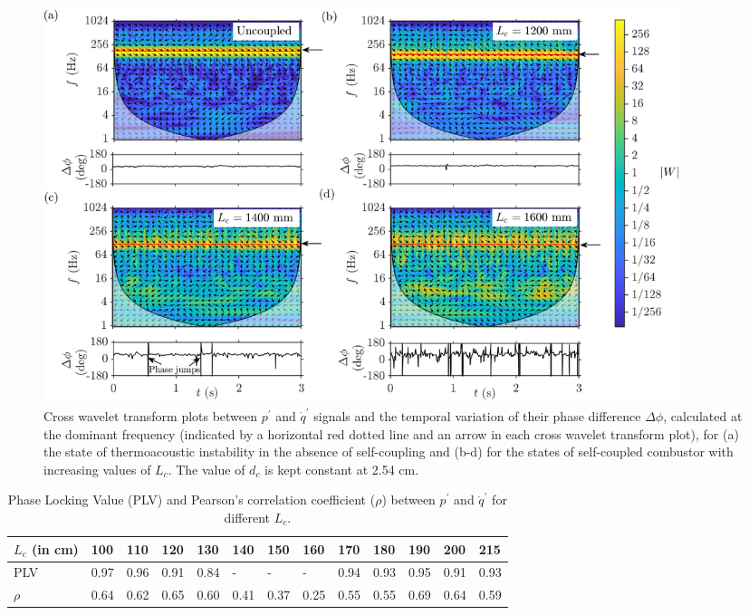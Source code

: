 \documentclass[%
preprint,
 amsmath,amssymb,
 aps,
 pra,
]{revtex4-2}
\begin{document}
\begin{figure}[t!]
\centering
\includegraphics[width=0.9\textwidth]{all_copy.png}
\caption{Cross wavelet transform plots between $p^\prime$ and $\dot{q}^\prime$ signals and the temporal variation of their phase difference $\Delta\phi$, calculated at the dominant frequency (indicated by a horizontal red dotted line and an arrow in each cross wavelet transform plot), for (a) the state of thermoacoustic instability in the absence of self-coupling and (b-d) for the states of self-coupled combustor with increasing values of $L_c$. The value of $d_c$ is kept constant at 2.54 cm. }
\label{fig4}
\end{figure}

\begin{table}[!b] \small
\centering
\caption{\label{table} Phase Locking Value (PLV) and Pearson's correlation coefficient ($\rho$) between $p^\prime$ and $\dot{q}^\prime$ for different $L_c$.}
\begin{tabular}{|l|l|l|l|l|l|l|l|l|l|l|l|l|}
\hline
$L_c$ (in cm)                   & 100  & 110  & 120  & 130  & 140  & 150  & 160  & 170  & 180  & 190  & 200  & 215  \\
\hline
PLV                 & 0.97 & 0.96 & 0.91 & 0.84 &   -   &    -  &   -   & 0.94 & 0.93 & 0.95 & 0.91 & 0.93 \\
\hline
$\rho$ & 0.64 & 0.62 & 0.65 & 0.60 & 0.41 & 0.37 & 0.25 & 0.55 & 0.55 & 0.69 & 0.64 & 0.59 \\
\hline
\end{tabular}
\label{table}
\end{table}
\end{document}
